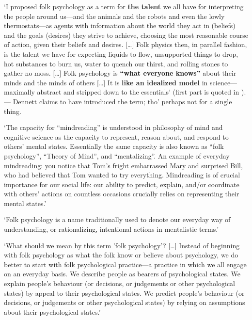 \documentclass[12pt,\papersize]{extarticle}
\begin{document}
`I proposed folk psychology as a term for \textbf{the talent} we all have for interpreting the people around us---and the animals and the robots and even the lowly thermostats---as agents with information about the world they act in (beliefs) and the goals (desires) they strive to achieve, choosing the most reasonable course of action, given their beliefs and desires. {[}\ldots{]} Folk physics then, in parallel fashion, is the talent we have for expecting liquids to flow, unsupported things to drop, hot substances to burn us, water to quench our thirst, and rolling stones to gather no moss. {[}\ldots{]} Folk psychology is \textbf{``what everyone knows''} about their minds and the minds of others {[}\ldots{]} It is \textbf{like an idealized model} in science---maximally abstract and stripped down to the essentials' \citep[pp.~73--74]{dennett:2014_intuition} (first part is quoted in \citep[p.~3]{molder:2016_mind}). --- Dennett claims to have introduced the term; tho' perhaps not for a single thing.

`The capacity for ``mindreading'' is understood in philosophy of mind and cognitive science as the capacity to represent, reason about, and respond to others' mental states. Essentially the same capacity is also known as ``folk psychology'', ``Theory of Mind'', and ``mentalizing''. An example of everyday mindreading: you notice that Tom's fright embarrassed Mary and surprised Bill, who had believed that Tom wanted to try everything. Mindreading is of crucial importance for our social life: our ability to predict, explain, and/or coordinate with others' actions on countless occasions crucially relies on representing their mental states.' \citep{barlassina:2017_folk}

`Folk psychology is a name traditionally used to denote our everyday way of understanding, or rationalizing, intentional actions in mentalistic terms.' \citep{hutto:2021_folk}

`What should we mean by this term 'folk psychology'? {[}\ldots{]} Instead of beginning with folk psychology as what the folk know or believe about psychology, we do better to start with folk psychological practice---a practice in which we all engage on an everyday basis. We describe people as bearers of psychological states. We explain people's behaviour (or decisions, or judgements or other psychological states) by appeal to their psychological states. We predict people's behaviour (or decisions, or judgements or other psychological states) by relying on assumptions about their psychological states.' \citep[p.~54]{davies:1998_folk}
\end{document}
